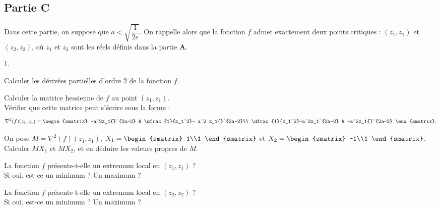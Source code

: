 \subsection*{Partie C}
\noindent
Dans cette partie, on suppose que $a<\sqrt{\dfrac{1}{2e}}$. On
rappelle alors que la fonction $f$ admet exactement deux points
critiques : $(z_1,z_1)$ et $(z_2,z_2)$, où $z_1$ et $z_2$ sont les
réels définis dans la partie {\bf A}.
\begin{noliste}{1.}
  \setcounter{enumi}{7}
\item Calculer les dérivées partielles d'ordre $2$ de la fonction $f$.
  
  
  
  
  

\item Calculer la matrice hessienne de $f$ au point $(z_1,z_1)$.\\
  Vérifier que cette matrice peut s'écrire sous la forme :
  \[
  \nabla^2(f)(z_1,z_1) = 
  \begin{smatrix}
    -a^2z_1{}^{2a-2} & \dfrac{1}{z_1^2}- a^2 z_1{}^{2a-2}\\
    \dfrac{1}{z_1^2}-a^2z_1^{2a-2} & -a^2z_1{}^{2a-2}
  \end{smatrix}.
  \]
  
  
  \newpage
  
  
\item On pose $M = \nabla^2(f)(z_1,z_1)$, $X_1 = 
  \begin{smatrix} 
    1\\1
  \end{smatrix}$ et $X_2 = 
  \begin{smatrix} 
    -1\\1
  \end{smatrix}$.\\
  Calculer $MX_1$ et $MX_2$, et en déduire les valeurs propres de $M$.
  
  




\item La fonction $f$ présente-t-elle un extremum local en $(z_1,z_1)$
  ? \\
  Si oui, est-ce un minimum ? Un maximum ?

  
  
\item La fonction $f$ présente-t-elle un extremum local en $(z_2,z_2)$
  ?\\
  Si oui, est-ce un minimum ? Un maximum ?

  
\end{noliste}

